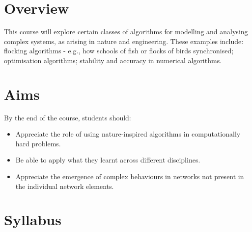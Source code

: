 \section*{Overview}

This course will explore certain classes of algorithms for modelling and
analysing complex systems, as arising in nature and engineering. These examples
include: flocking algorithms - e.g., how schools of fish or flocks of birds
synchronised; optimisation algorithms; stability and accuracy in numerical
algorithms.

\section*{Aims}

By the end of the course, students should:
\begin{itemize}
\item Appreciate the role of using nature-inspired algorithms in
computationally hard problems.
\item Be able to apply what they learnt across different disciplines.
\item Appreciate the emergence of complex behaviours in networks not present in
the individual network elements.
\end{itemize}

\section*{Syllabus}

